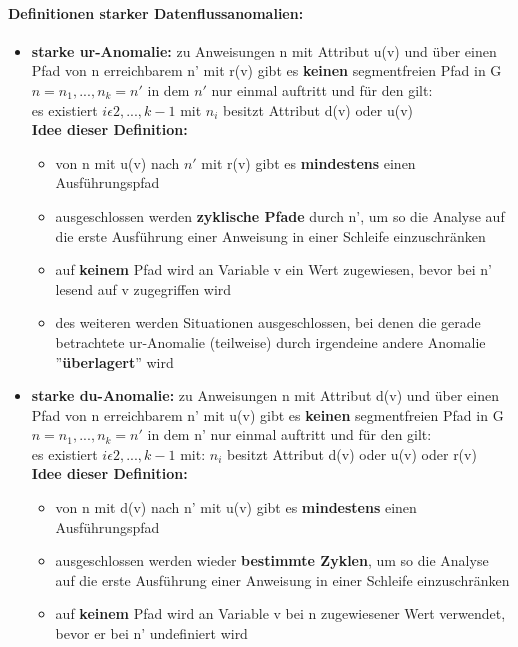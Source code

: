 \paragraph{Definitionen starker Datenflussanomalien:}
\begin{itemize}
	\item \textbf{starke ur-Anomalie:} zu Anweisungen n mit Attribut u(v) und über einen Pfad von n erreichbarem n' mit r(v) gibt es \textbf{keinen} segmentfreien Pfad in G $n = n_{1}, ... , n_{k} = n'$ in dem $n'$ nur einmal auftritt und für den gilt: \\
	es existiert $i \epsilon 2, ... ,k-1$ mit $n_{i}$ besitzt Attribut d(v) oder u(v) \\
	\textbf{Idee dieser Definition:}
	\begin{itemize}
		\item von n mit u(v) nach $n'$ mit r(v) gibt es \textbf{mindestens} einen Ausführungspfad
		\item ausgeschlossen werden \textbf{zyklische Pfade} durch n', um so die Analyse auf die erste Ausführung einer Anweisung in einer Schleife einzuschränken
		\item auf \textbf{keinem} Pfad wird an Variable v ein Wert zugewiesen, bevor bei n' lesend auf v zugegriffen wird
		\item des weiteren werden Situationen ausgeschlossen, bei denen die gerade betrachtete ur-Anomalie (teilweise) durch irgendeine andere Anomalie ''\textbf{überlagert}'' wird
	\end{itemize}
	\item \textbf{starke du-Anomalie:} zu Anweisungen n mit Attribut d(v) und über einen Pfad von n erreichbarem n' mit u(v) gibt es \textbf{keinen} segmentfreien Pfad in G $n = n_{1}, ... , n_{k} = n'$ in dem n' nur einmal auftritt und für den gilt: \\
	es existiert $i \epsilon 2, ... , k-1$ mit: $n_{i}$ besitzt Attribut d(v) oder u(v) oder r(v) \\
	\textbf{Idee dieser Definition:}
	\begin{itemize}
		\item von n mit d(v) nach n' mit u(v) gibt es \textbf{mindestens} einen Ausführungspfad
		\item ausgeschlossen werden wieder \textbf{bestimmte Zyklen}, um so die Analyse auf die erste Ausführung einer Anweisung in einer Schleife einzuschränken
		\item auf \textbf{keinem} Pfad wird an Variable v bei n zugewiesener Wert verwendet, bevor er bei n' undefiniert wird

\end{itemize}
\end{itemize}
